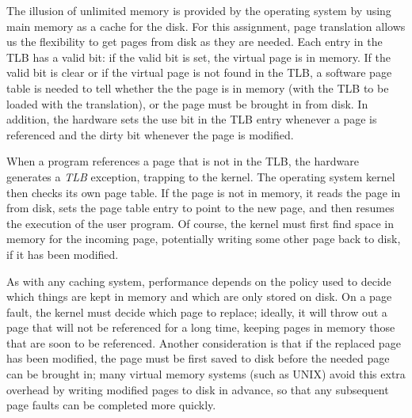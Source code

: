 The illusion of unlimited memory is provided by the operating system
by using main memory as a cache for the disk.  For this assignment, 
page translation allows us the flexibility to get pages from disk as
they are needed.  Each entry in the TLB has a valid bit:
if the valid bit is set, the virtual page is in memory.  If the valid bit is 
clear or if the virtual page is not found in the TLB, a software page table
is needed to tell whether the the page is in memory (with the TLB to be 
loaded with the translation), or the page must be brought in from disk.
In addition, the hardware sets the use bit in the TLB entry whenever
a page is referenced and the dirty bit whenever the page is modified.

When a program references a page that is not in the TLB,
the hardware generates a {\em TLB} exception, trapping to the kernel.
The operating system kernel then checks its own page table.  If the
page is not in memory, it reads the page in from disk,
sets the page table entry to point to the new page, and then resumes 
the execution of the user program.  Of course, the kernel must  
first find space in memory for the incoming page, potentially
writing some other page back to disk, if it has been modified.

As with any caching system, performance depends on the policy
used to decide which things are kept in memory and which
are only stored on disk.  
On a page fault, the kernel must decide which page to replace;
ideally, it will throw out a page that will not be referenced for 
a long time, keeping pages in memory those that are soon to be 
referenced.  Another consideration is that if the replaced page 
has been modified, the page must be first saved to disk before the needed
page can be brought in; many virtual memory systems (such as UNIX)
avoid this extra overhead by writing modified pages to disk in 
advance, so that any subsequent page faults can be completed more quickly.

